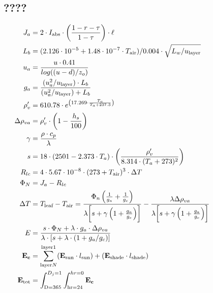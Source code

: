 \documentclass[12pt]{report}
\begin{document}
\subsection*{????}
\begin{align}
 J_a &= 2 \cdot I_{\text{abs}} \cdot \left(\frac{1-r-\tau}{1-\tau}\right) \cdot \ell \label{eqn:Ja} \\
 L_b &= (2.126 \cdot 10^{-5} + 1.48 \cdot 10^{-7} \cdot T_{\text{air}}) / 0.004 \cdot \sqrt{L_w / u_{\text{layer}}} \label{eqn:Lb}\\
 u_a &= \frac{u \cdot 0.41}{log((u-d)/z_o)} \hspace{3.1in} \label{eqn:ua} \\
 g_a &= \frac{(u_{a}^{2}/u_{\text{layer}}) \cdot L_b}{(u_{a}^{2}/u_{\text{layer}}) + L_b} \label{eqn:ga} \\
 \rho_{v}^{\prime} &= 610.78 \cdot e^{\left( 17.269 \cdot \frac{T_a}{T_a + 237.3} \right)} \label{eqn:rhop} \\
 \Delta \rho_{va} &= \rho_{v}^{\prime} \cdot \left( 1-\frac{h_s}{100} \right) \label{eqn:Deltarho} \\
 \gamma &= \frac{\rho \cdot c_p}{\lambda} \label{eqn:gamma} \\
 s &= 18 \cdot (2501 - 2.373 \cdot T_a) \cdot \left(\frac{\rho_{v}^{\prime}}{8.314 \cdot (T_a + 273)^2} \right) \label{eqn:s} \\
 R_{lc} &= 4 \cdot 5.67 \cdot 10^{-8} \cdot (273+T_{\text{air}})^3 \cdot \Delta T \label{eqn:Rlc} \\
 \Phi_N &= J_a - R_{lc} \label{eqn:PhiN} \\
 \Delta T &= T_{\text{leaf}} - T_{\text{air}} = \frac{\Phi_n \left(\frac{1}{g_a}+\frac{1}{g_c} \right)}{\lambda \biggl[ s+ \gamma \left( 1 + \frac{g_a}{g_c} \right) \biggr]} - \frac{\lambda \Delta \rho_{va}}{\lambda \biggl[ s+\gamma\left(1+\frac{g_a}{g_c}\right) \biggr] } \label{eqn:DeltaT} \\
 E &= \frac{ s \cdot \Phi_N + \lambda \cdot g_a \cdot \Delta \rho_{va}}{\lambda \cdot [ s + \lambda \cdot (1+g_a / g_c)]} \label{eqn:E} \\
 \mathbf{E_c} &= \sum_{\text{layer} N}^{\text{layer} 1} (\mathbf{E_{\text{sun}}} \cdot l_{\text{sun}}) + (\mathbf{E_{\text{shade}}} \cdot l_{\text{shade}}) \label{eqn:Ec}\\ 
 \mathbf{E_{\text{tot}}} &= \int_{\text{D} = 365}^{D_j = 1}\int_{\text{hr} = 24}^{hr=0} \mathbf{E_c} \label{eqn:Etot} \\
\end{align}
\end{document}
